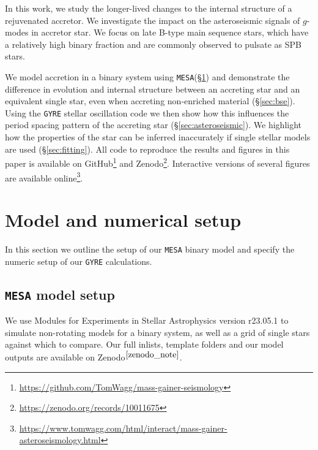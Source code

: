 \documentclass[twocolumn, twocolappendix, oneside]{aastex631}
\newcommand{\gmodes}{$g$-modes\xspace}
\newcommand{\mesa}{\texttt{MESA}\xspace}
\newcommand{\gyre}{\texttt{GYRE}\xspace}
\begin{document}
In this work, we study the longer-lived changes to the internal structure of a rejuvenated accretor.  We investigate the impact on the asteroseismic signals of \gmodes in accretor star.  We focus on late B-type main sequence stars, which have a relatively high binary fraction and are commonly observed to pulsate as SPB stars. 

We model accretion in a binary system using \mesa (\S\ref{sec:methods}) and demonstrate the difference in evolution and internal structure between an accreting star and an equivalent single star, even when accreting non-enriched material (\S\ref{sec:bse}). Using the \gyre stellar oscillation code we then show how this influences the period spacing pattern of the accreting star (\S\ref{sec:asteroseismic}). We highlight how the properties of the star can be inferred inaccurately if single stellar models are used (\S\ref{sec:fitting}). All code to reproduce the results and figures in this paper is available on GitHub\footnote{\url{https://github.com/TomWagg/mass-gainer-seismology}} and Zenodo\footnote{\url{https://zenodo.org/records/10011675}\label{zenodo_note}}. Interactive versions of several figures are available online\footnote{\url{https://www.tomwagg.com/html/interact/mass-gainer-asteroseismology.html}}.

\section{Model and numerical setup} \label{sec:methods}

In this section we outline the setup of our \mesa binary model and specify the numeric setup of our \gyre calculations.

\subsection{\mesa model setup}\label{sec:model_setup}

We use Modules for Experiments in Stellar Astrophysics \citep[\mesa,][]{Paxton2011, Paxton2013, Paxton2015, Paxton2018, Paxton2019, Jermyn2023} version r23.05.1 \citep{mesa_zenodo} to simulate non-rotating models for a binary system, as well as a grid of single stars against which to compare. Our full inlists, template folders and our model outputs are available on Zenodo$^{\ref{zenodo_note}}$.
\end{document}
